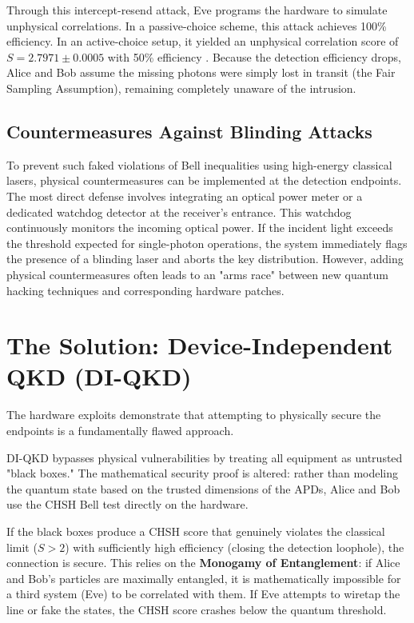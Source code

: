 Through this intercept-resend attack, Eve programs the hardware to simulate unphysical correlations. In a passive-choice scheme, this attack achieves 100\% efficiency. In an active-choice setup, it yielded an unphysical correlation score of $S = 2.7971 \pm 0.0005$ with 50\% efficiency \cite{gerhardt2011}. Because the detection efficiency drops, Alice and Bob assume the missing photons were simply lost in transit (the Fair Sampling Assumption), remaining completely unaware of the intrusion.

\subsection{Countermeasures Against Blinding Attacks}
To prevent such faked violations of Bell inequalities using high-energy classical lasers, physical countermeasures can be implemented at the detection endpoints. The most direct defense involves integrating an optical power meter or a dedicated watchdog detector at the receiver's entrance. This watchdog continuously monitors the incoming optical power. If the incident light exceeds the threshold expected for single-photon operations, the system immediately flags the presence of a blinding laser and aborts the key distribution. However, adding physical countermeasures often leads to an "arms race" between new quantum hacking techniques and corresponding hardware patches.

\section{The Solution: Device-Independent QKD (DI-QKD)}
The hardware exploits demonstrate that attempting to physically secure the endpoints is a fundamentally flawed approach. 

DI-QKD bypasses physical vulnerabilities by treating all equipment as untrusted "black boxes." The mathematical security proof is altered: rather than modeling the quantum state based on the trusted dimensions of the APDs, Alice and Bob use the CHSH Bell test directly on the hardware. 

If the black boxes produce a CHSH score that genuinely violates the classical limit ($S > 2$) with sufficiently high efficiency (closing the detection loophole), the connection is secure. This relies on the \textbf{Monogamy of Entanglement}: if Alice and Bob's particles are maximally entangled, it is mathematically impossible for a third system (Eve) to be correlated with them. If Eve attempts to wiretap the line or fake the states, the CHSH score crashes below the quantum threshold.

